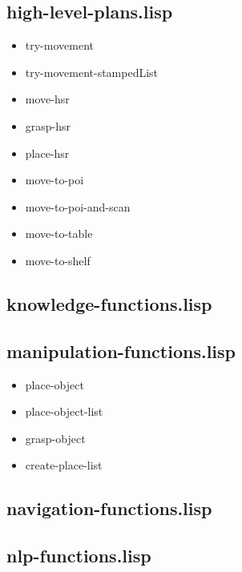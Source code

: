 \documentclass[main.tex]{subfiles}
\begin{document}
	    \subsection{high-level-plans.lisp}
	    \begin{itemize}
	    \item try-movement\\
		\item try-movement-stampedList\\
	    \item move-hsr\\
	    \item grasp-hsr\\
	    \item place-hsr\\
	    \item move-to-poi\\
	    \item move-to-poi-and-scan\\
	    \item move-to-table\\
	    \item move-to-shelf\\
		\end{itemize}
	    \subsection{knowledge-functions.lisp}
	    \subsection{manipulation-functions.lisp}
	    \begin{itemize}
	    \item place-object\\
		\item place-object-list\\
	    \item grasp-object\\
	    \item create-place-list\\
		\end{itemize}
	    \subsection{navigation-functions.lisp}
	    \subsection{nlp-functions.lisp}
\end{document}
